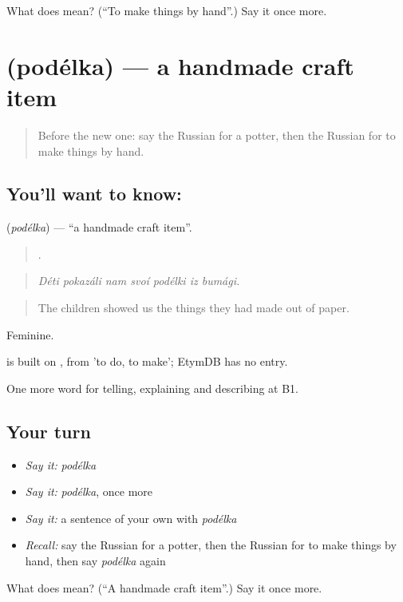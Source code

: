 \begin{tcolorbox}[breakable,colback=teal!4,colframe=teal!35!black,title={Before you move on}]
What does  mean? (\textquotedblleft{}To make things by hand\textquotedblright{}.) Say it once more.
\end{tcolorbox}
\section[\texorpdfstring{\ru{поделка} (podélka)}{поделка (podélka)}]{ (podélka) — a handmade craft item}

\label{lesson:RU-C502-podelka}



\begin{quote}
Before the new one: say the Russian for a potter, then the Russian for to make things by hand.
\end{quote}

\subsection*{You'll want to know: }
\textbf{} (\emph{podélka}) — \textquotedblleft{}a handmade craft item\textquotedblright{}.

\begin{quote}
      .
\end{quote}

\begin{quote}
\emph{Déti pokazáli nam svoí podélki iz bumági.}
\end{quote}

\begin{quote}
The children showed us the things they had made out of paper.
\end{quote}

Feminine.

\begin{cousinweb}
\emph{} is built on \emph{}, from \emph{} 'to do, to make'; EtymDB has no entry.
\end{cousinweb}

\begin{grammarlens}[title={What you've built}]
One more word for telling, explaining and describing at B1.
\end{grammarlens}

\subsection*{Your turn}
\begin{itemize}
\raggedright
  \item \emph{Say it:} \emph{podélka}
  \item \emph{Say it:} \emph{podélka}, once more
  \item \emph{Say it:} a sentence of your own with \emph{podélka}
  \item \emph{Recall:} say the Russian for a potter, then the Russian for to make things by hand, then say \emph{podélka} again
\end{itemize}

\begin{tcolorbox}[breakable,colback=teal!4,colframe=teal!35!black,title={Before you move on}]
What does  mean? (\textquotedblleft{}A handmade craft item\textquotedblright{}.) Say it once more.
\end{tcolorbox}
